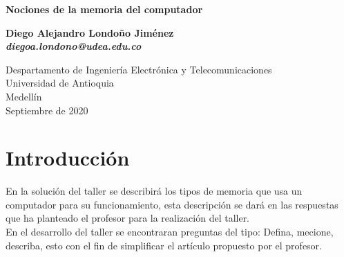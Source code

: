 \documentclass[12pt,letterpaper]{article}
\begin{document}

\begin{titlepage}
    \begin{center}
        \vspace*{1cm}
            
        \Huge
        \textbf{Nociones de la memoria del computador \textcolor{red}{\Biohazard}}
            
        \vspace{0.5cm}
        \LARGE
            
        \vspace{1.5cm}
            
        \textbf{Diego Alejandro Londoño Jiménez\\ \emph{diegoa.londono@udea.edu.co} }
            
        \vfill
            
        \vspace{0.8cm}
            
        \Large
        Despartamento de Ingeniería Electrónica y Telecomunicaciones\\
        Universidad de Antioquia\\
        Medellín\\
        Septiembre de 2020\\
        
            
    \end{center}
\end{titlepage}



\tableofcontents



\newpage

\section{Introducción}

En la solución del taller se describirá los tipos de memoria que usa un computador para su funcionamiento, esta descripción se dará en las respuestas que ha planteado el profesor para la realización del taller.\\

En el desarrollo del taller se encontraran preguntas del tipo: Defina, mecione, describa, esto con el fin de simplificar el artículo propuesto por el profesor.\\
\end{document}

